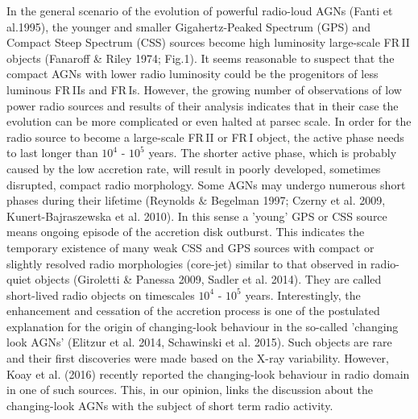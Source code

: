 \documentclass[utf8]{frontiersSCNS} %
\begin{document}
In the general scenario of the evolution of powerful radio-loud AGNs (Fanti et al.1995), the younger and smaller Gigahertz-Peaked Spectrum (GPS) and Compact Steep Spectrum (CSS) sources become high luminosity large-scale FR\,II objects (Fanaroff \& Riley 1974; Fig.1). 
It seems reasonable to suspect that the compact AGNs with lower radio luminosity could be the progenitors of less luminous FR\,IIs and FR\,Is. However, the growing number of observations of low power radio sources and results of their analysis indicates that in their case the evolution can be more complicated or even halted at parsec scale. In order for the radio source to become a large-scale FR\,II or FR\,I object, the active phase needs to last longer than $10^4$ - $10^5$ years. The shorter active phase, which is probably caused by the low accretion rate, will result in poorly developed, sometimes disrupted, compact radio morphology. Some AGNs may undergo numerous short phases during their lifetime (Reynolds $\&$ Begelman 1997; Czerny et al. 2009, Kunert-Bajraszewska et al. 2010).
In this sense a 'young' GPS or CSS source means ongoing episode of the accretion disk outburst. 
This indicates the temporary existence of many weak CSS and GPS sources with compact or slightly resolved radio morphologies (core-jet) similar to that observed in radio-quiet objects (Giroletti \& Panessa 2009, Sadler et al. 2014). They are called short-lived radio objects on timescales $10^4$ - $10^5$ years. Interestingly, the enhancement and cessation of the accretion process is one of the postulated explanation for the origin of changing-look behaviour in the so-called 'changing look AGNs' (Elitzur et al. 2014, Schawinski et al. 2015). Such objects are rare and their first discoveries were made based on the X-ray variability. However, Koay et al. (2016) recently reported the changing-look behaviour in radio domain in one of such sources. This, in our opinion, links the discussion about the changing-look AGNs with the subject of short term radio activity.

\end{document}
